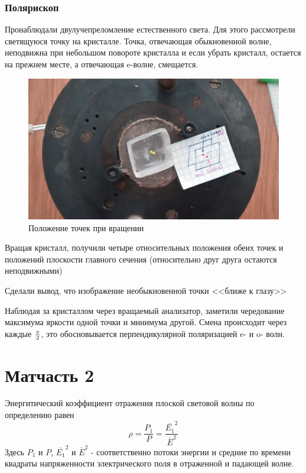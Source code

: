 \subsubsection{Полярископ}

Пронаблюдали двулучепреломление естественного света. Для этого рассмотрели светящуюся точку на кристалле. Точка, отвечающая обыкновенной волне, неподвижна при небольшом повороте кристалла и если убрать кристалл, остается на прежнем месте, а отвечающая e-волне, смещается.

\begin{figure}[H]
	\centering
	\includegraphics[width=\textwidth]{pic/dv.jpg}
	\caption{Положение точек при вращении}
	\label{fig:figure1}
\end{figure}

Вращая кристалл, получили четыре относительных положения обеих точек и положений плоскости главного сечения (относительно друг друга остаются неподвижными)

Сделали вывод, что изображение необыкновенной точки <<ближе к глазу>>

Наблюдая за кристаллом через вращаемый анализатор, заметили чередование максимума яркости одной точки и минимума другой. Смена происходит через каждые $\pi\over2$, это обосновывается перпендикулярной поляризацией e- и o- волн.
\section{Матчасть 2}
Энергитический коэффициент отражения плоской световой волны по определению равен
\begin{equation}
	\rho=\frac{P_1}{P}=\frac{\bar{E_1}^2}{\bar{E}^2}
\end{equation}
Здесь $P_1$ и $P$, $\bar{E_1}^2$ и $\bar{E}^2$ - соответственно потоки энергии и средние по времени квадраты напряженности электрического поля в отраженной и падающей волне.

